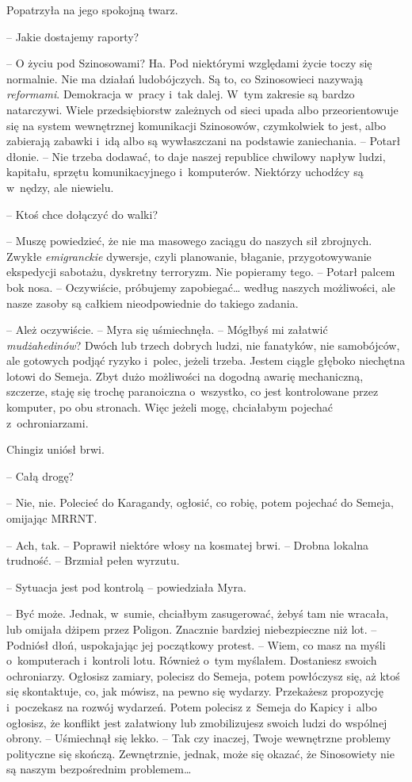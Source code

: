 \documentclass[oneside,polish,11pt,sfheadings]{mwbk}
\begin{document}
Popatrzyła na jego spokojną twarz.

-- Jakie dostajemy raporty?

-- O życiu pod Szinosowami? Ha. Pod niektórymi względami życie toczy się
normalnie. Nie ma działań ludobójczych. Są to, co Szinosowieci nazywają
\textit{reformami}. Demokracja w~pracy i~tak dalej. W~tym zakresie są
bardzo natarczywi. Wiele przedsiębiorstw zależnych od sieci upada albo
przeorientowuje się na system wewnętrznej komunikacji Szinosowów,
czymkolwiek to jest, albo zabierają zabawki i~idą albo są wywłaszczani
na podstawie zaniechania. -- Potarł dłonie. -- Nie trzeba dodawać, to daje
naszej republice chwilowy napływ ludzi, kapitału, sprzętu
komunikacyjnego i~komputerów. Niektórzy uchodźcy są w~nędzy, ale
niewielu.

-- Ktoś chce dołączyć do walki?

-- Muszę powiedzieć, że nie ma masowego zaciągu do naszych sił zbrojnych.
Zwykłe \textit{emigranckie} dywersje, czyli planowanie, błaganie,
przygotowywanie ekspedycji sabotażu, dyskretny terroryzm. Nie popieramy
tego. -- Potarł palcem bok nosa. -- Oczywiście, próbujemy zapobiegać\ldots
według naszych możliwości, ale nasze zasoby są całkiem nieodpowiednie do
takiego zadania.

-- Ależ oczywiście. -- Myra się uśmiechnęła. -- Mógłbyś mi załatwić
\textit{mudżahedinów}? Dwóch lub trzech dobrych ludzi, nie fanatyków, nie
samobójców, ale gotowych podjąć ryzyko i~polec, jeżeli trzeba. Jestem
ciągle głęboko niechętna lotowi do Semeja. Zbyt dużo możliwości na
dogodną awarię mechaniczną, szczerze, staję się trochę paranoiczna o~wszystko, co jest kontrolowane przez komputer, po obu stronach. Więc
jeżeli mogę, chciałabym pojechać z~ochroniarzami.

Chingiz uniósł brwi. 

-- Całą drogę?

-- Nie, nie. Polecieć do Karagandy, ogłosić, co robię, potem pojechać do
Semeja, omijając MRRNT.

-- Ach, tak. -- Poprawił niektóre włosy na kosmatej brwi. -- Drobna lokalna
trudność. -- Brzmiał pełen wyrzutu.

-- Sytuacja jest pod kontrolą -- powiedziała Myra.

-- Być może. Jednak, w~sumie, chciałbym zasugerować, żebyś tam nie
wracała, lub omijała dżipem przez Poligon. Znacznie bardziej niebezpieczne niż lot. -- Podniósł
dłoń, uspokajając jej początkowy protest. -- Wiem, co masz na myśli o~komputerach i~kontroli lotu. Również o~tym myślałem. Dostaniesz swoich
ochroniarzy. Ogłosisz zamiary, polecisz do Semeja, potem powłóczysz się,
aż ktoś się skontaktuje, co, jak mówisz, na pewno się wydarzy.
Przekażesz propozycję i~poczekasz na rozwój wydarzeń. Potem polecisz z~Semeja do Kapicy i~albo ogłosisz, że konflikt jest załatwiony lub
zmobilizujesz swoich ludzi do wspólnej obrony. -- Uśmiechnął się lekko. -- Tak czy inaczej, Twoje wewnętrzne problemy polityczne się skończą.
Zewnętrznie, jednak, może się okazać, że Sinosowiety nie są naszym
bezpośrednim problemem\ldots
\end{document}
